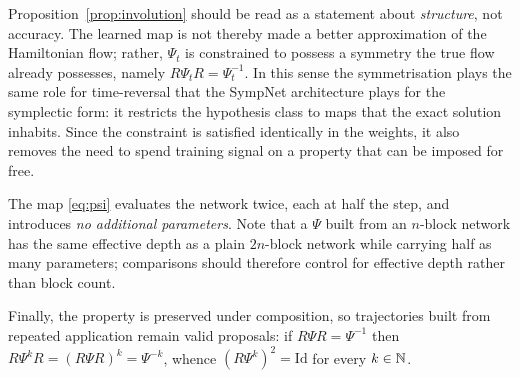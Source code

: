 Proposition~\ref{prop:involution} should be read as a statement about
\emph{structure}, not accuracy. The learned map is not thereby made a better
approximation of the Hamiltonian flow; rather, $\Psi_t$ is constrained to
possess a symmetry the true flow already possesses, namely
$R \Psi_t R = \Psi_t^{-1}$. In this sense the symmetrisation plays the same
role for time-reversal that the SympNet architecture plays for the symplectic
form: it restricts the hypothesis class to maps that the exact solution
inhabits. Since the constraint is satisfied identically in the weights, it
also removes the need to spend training signal on a property that can be
imposed for free.

The map \eqref{eq:psi} evaluates the network twice, each at half the step, and
introduces \emph{no additional parameters}. Note that a $\Psi$ built from an
$n$-block network has the same effective depth as a plain $2n$-block network
while carrying half as many parameters; comparisons should therefore control
for effective depth rather than block count.

Finally, the property is preserved under composition, so trajectories built
from repeated application remain valid proposals: if $R \Psi R = \Psi^{-1}$
then $R \Psi^{k} R = (R\Psi R)^{k} = \Psi^{-k}$, whence
$(R \Psi^{k})^2 = \mathrm{Id}$ for every $k \in \mathbb{N}$.
